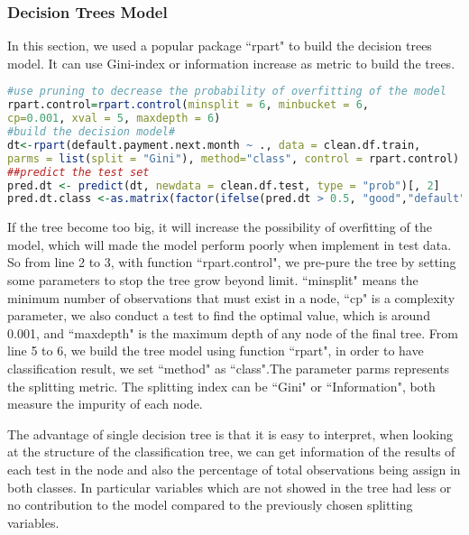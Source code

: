 \documentclass[a4paper,11pt]{article}
\begin{document}
\subsubsection{Decision Trees Model}
In this section, we used a popular package ``rpart" to build the decision trees model. It can use Gini-index or information increase as metric to build the trees.
\begin{lstlisting}[language=R]
#use pruning to decrease the probability of overfitting of the model
rpart.control=rpart.control(minsplit = 6, minbucket = 6,
cp=0.001, xval = 5, maxdepth = 6)
#build the decision model#
dt<-rpart(default.payment.next.month ~ ., data = clean.df.train, 
parms = list(split = "Gini"), method="class", control = rpart.control)
##predict the test set
pred.dt <- predict(dt, newdata = clean.df.test, type = "prob")[, 2]
pred.dt.class <-as.matrix(factor(ifelse(pred.dt > 0.5, "good","default")))
\end{lstlisting}
If the tree become too big, it will increase the possibility of overfitting of the model, which will made the model perform poorly when implement in test data. So from line 2 to 3, with function ``rpart.control", we pre-pure the tree by setting some parameters to stop the tree grow beyond limit. ``minsplit" means the minimum number of observations that must exist in a node, ``cp" is a complexity parameter, we also conduct a test to find the optimal value, which is around 0.001, and ``maxdepth" is the maximum depth of any node of the final tree. From line 5 to 6, we build the tree model using function ``rpart", in order to have classification result, we set ``method" as ``class".The parameter parms represents the splitting metric. The splitting index can be ``Gini" or ``Information", both measure the impurity of each node.

The advantage of single decision tree is that it is easy to interpret, when looking at the structure of the classification tree, we can get information of the results of each test in the node and also the percentage of total observations being assign in both classes. In particular variables which are not showed in the tree had less or no contribution to the model compared to the previously chosen splitting variables.
\end{document}

